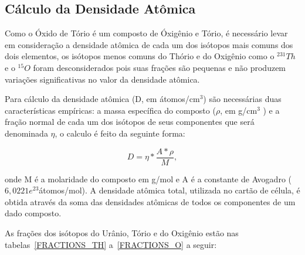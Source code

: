 \documentclass[
	12pt,				%
	openany,			%
	twoside,			%
	a4paper,			%
	english,			%
	french,				%
	spanish,			%
	brazil				%
	]{abntex2}
\begin{document}
\subsection*{Cálculo da Densidade Atômica}

Como o Óxido de Tório é um composto de Óxigênio e Tório, é necessário
levar em consideração a densidade atômica de cada um dos isótopos
mais comuns dos dois elementos, os isótopos menos comuns do Thório
e do Oxigênio como o $^{231}Th$ e o $^{15}O$ foram desconsiderados
pois suas frações são pequenas e não produzem variações significativas
no valor da densidade atômica.

Para cálculo da densidade atômica (D, em átomos/cm$^3$) são necessárias duas características
empíricas: a massa específica do composto ($\rho$, em g/cm$^3$ )
e a fração normal de cada um dos isótopos de seus componentes que
será denominada $\eta$, o calculo é feito da seguinte forma:

\begin{equation}
D=\eta*\frac{A*\rho}{M},
\end{equation}

onde M é a molaridade do composto em g/mol e A é a constante de Avogadro
($6,0221e^{23}$átomos/mol). A densidade atômica total, utilizada
no cartão de célula, é obtida através da soma das densidades atômicas
de todos os componentes de um dado composto.

As frações dos isótopos do Urânio, Tório e do Oxigênio estão nas tabelas~\ref{FRACTIONS_TH} a~\ref{FRACTIONS_O}
a seguir:
\end{document}

